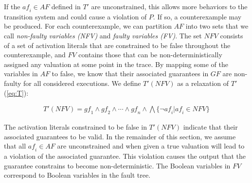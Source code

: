 If the $\mathit{af_i} \in \mathit{AF}$ defined in $T'$ are unconstrained, this allows more behaviors to the transition system and could cause a violation of $P$. If so, a counterexample may be produced. For each counterexample, we can partition $\mathit{AF}$ into two sets that we call {\em non-faulty variables (NFV)} and {\em faulty variables (FV)}.  The set $\mathit{NFV}$ consists of a set of activation literals that are constrained to be false throughout the counterexample, and $\mathit{FV}$ contains those that can be non-deterministically assigned any valuation at some point in the trace. By mapping some of the variables in $\mathit{AF}$ to false, we know that their associated guarantees in $\mathit{GF}$ are non-faulty for all considered executions. We define $T'(\mathit{NFV})$ as a relaxation of $T'$ (\ref{eq:T}):

\begin{gather*}
T'(\mathit{NFV}) = \mathit{gf_1} \land \mathit{gf_2} \land \cdots \land \mathit{gf_n} \land \bigwedge \{\neg \mathit{af_i} | \mathit{af_i} \in \mathit{NFV} \}
\end{gather*}

The activation literals constrained to be false in $T'(\mathit{NFV})$ indicate that their associated guarantees to be valid. In the remainder of this section, we assume that all $\mathit{af_i} \in \mathit{AF}$ are unconstrained and when given a true valuation will lead to a violation of the associated guarantee. This violation causes the output that the guarantee constrains to become non-deterministic. The Boolean variables in $\mathit{FV}$ correspond to Boolean variables in the fault tree. 



